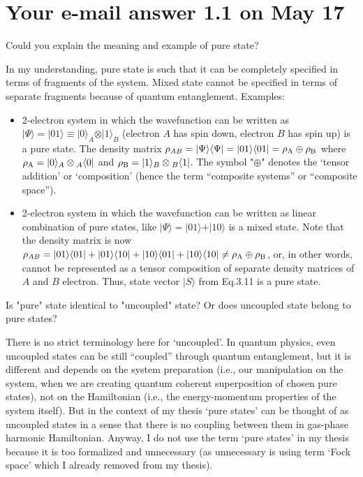 \documentclass{exam}
\begin{document}
\section{Your e-mail answer 1.1 on May 17}
\begin{questions}

%
\question Could you explain the meaning and example of pure state?

\begin{solution}
In my understanding, pure state is such that it can be completely specified in terms of fragments
of the system. Mixed state cannot be specified in terms of separate fragments because of
quantum entanglement. Examples: 
\begin{itemize}
 \item 2-electron system
in which the wavefunction can be written as $\vert \Psi \rangle = \vert 01 \rangle 
\equiv \vert 0 \rangle_A \otimes \vert 1 \rangle_B$ (electron $A$ has spin down, 
electron $B$ has spin up) is a pure state. The density matrix 
$\rho_{AB} = \vert \Psi \rangle  \langle \Psi \vert 
= \vert 01 \rangle \langle 01 \vert
= \rho_{\rm A} \oplus \rho_{\rm B}$
where $\rho_{\rm A} = \vert 0 \rangle_A \otimes {}_A\langle 0 \vert$
and $\rho_{\rm B} = \vert 1 \rangle_B \otimes {}_B\langle 1 \vert$. The symbol "$\oplus$" denotes
the `tensor addition' or `composition' (hence the term ``composite systems'' 
or ``composite space'').
 \item 2-electron system
in which the wavefunction can be written as linear combination of pure states, 
like $\vert \Psi \rangle = \vert 01 \rangle + \vert 10 \rangle$ is a mixed state.
Note that the density matrix is now
%
$\rho_{AB} = \vert 01 \rangle \langle 01 \vert +
             \vert 01 \rangle \langle 10 \vert + 
             \vert 10 \rangle \langle 01 \vert +
             \vert 10 \rangle \langle 10 \vert
\ne \rho_{\rm A} \oplus \rho_{\rm B}$, or, in other words, cannot be represented as 
a tensor composition of separate density matrices of $A$ and $B$ electron. Thus, 
state vector $\vert S \rangle$ from Eq.3.11 is a pure state.
\end{itemize}
\end{solution}

%
\question Is "pure" state identical to "uncoupled" state? Or does uncoupled state belong to pure states?

\begin{solution}
There is no strict terminology
here for `uncoupled'.
In quantum physics, even uncoupled states can be still ``coupled'' through
quantum entanglement, but it is different and depends on the system preparation (i.e.,
our manipulation on the system, when we are creating quantum coherent superposition of chosen pure states),
not on the Hamiltonian (i.e., the energy-momentum properties of the system itself). 
But in the context of my thesis `pure states' 
can be thought of as uncoupled states in a sense that there is no coupling between them
in gas-phase harmonic Hamiltonian. Anyway, I do not use the term `pure states' in my thesis
because it is too formalized and unnecessary (as unnecessary is using term `Fock space' which I already
removed from my thesis).
\end{solution}


\end{questions}
\end{document}
